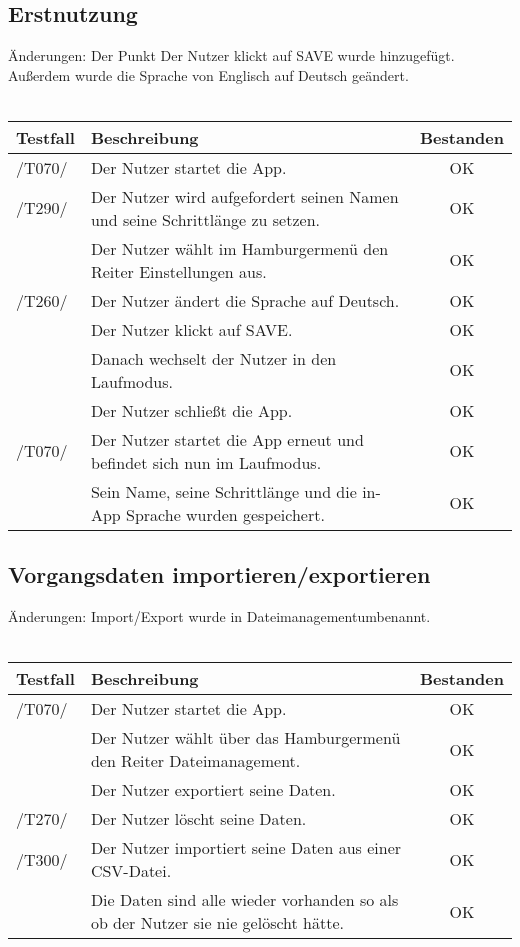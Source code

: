 \documentclass[a4paper,12pt]{article}
\begin{document}
\subsection{Erstnutzung}
Änderungen: Der Punkt \glqq Der Nutzer klickt auf SAVE\grqq{} wurde hinzugefügt. Außerdem wurde die Sprache von Englisch auf Deutsch geändert.
\\
\\
\begin{tabular}{ |p{1.5cm} | p{12cm} | c| }
	\hline
	\textbf{Testfall} & \textbf{Beschreibung} & \textbf{Bestanden}\\
	\hline
	/T070/ & Der Nutzer startet die App. & OK\\
	\hline
	/T290/ & Der Nutzer wird aufgefordert seinen Namen und seine Schrittlänge zu setzen. & OK \\
	\hline
	& Der Nutzer wählt im Hamburgermenü den Reiter Einstellungen aus. & OK \\
	\hline
	/T260/ & Der Nutzer ändert die Sprache auf Deutsch. & OK \\
	\hline
	& Der Nutzer klickt auf \glqq SAVE\grqq . & OK \\
	\hline
	& Danach wechselt der Nutzer in den \glqq Laufmodus\grqq . & OK \\
	\hline
	& Der Nutzer schließt die App. & OK \\
	\hline
	/T070/ & Der Nutzer startet die App erneut und befindet sich nun im \glqq Laufmodus\grqq . & OK \\
	\hline	
	& Sein Name, seine Schrittlänge und die in-App Sprache wurden gespeichert. & OK \\
	\hline
\end{tabular}



\subsection{Vorgangsdaten importieren/exportieren}
Änderungen: \glqq Import/Export\grqq{} wurde in \glqq Dateimanagement\grqq umbenannt.
\\
\\
\begin{tabular}{ |p{1.5cm} | p{12cm} | c| }
	\hline
	\textbf{Testfall} & \textbf{Beschreibung} & \textbf{Bestanden}\\
	\hline
	/T070/ & Der Nutzer startet die App. & OK\\
	\hline
	& Der Nutzer wählt über das Hamburgermenü den Reiter \glqq Dateimanagement\grqq . & OK \\
	\hline
	& Der Nutzer exportiert seine Daten. & OK\\
	\hline
	/T270/ & Der Nutzer löscht seine Daten. & OK\\
	\hline
	/T300/ & Der Nutzer importiert seine Daten aus einer CSV-Datei. & OK\\
	\hline
	& Die Daten sind alle wieder vorhanden so als ob der Nutzer sie nie gelöscht hätte. & OK\\
	\hline
\end{tabular}
\end{document}
